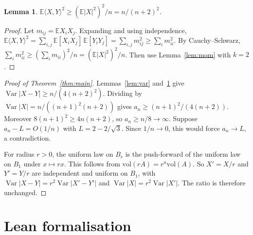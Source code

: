 \documentclass[11pt]{article}
\newtheorem{lemma}[theorem]{Lemma}
\newcommand{\E}{\mathbb{E}}
\newcommand{\Var}{\operatorname{Var}}
\begin{document}
\begin{lemma}\label{lem:inner}
$\E\langle X,Y\rangle^2 \ge (\E|X|^2)^2/n = n/(n+2)^2$.
\end{lemma}
\begin{proof}
Let $m_{ij} = \E X_iX_j$. Expanding and using independence,
$\E\langle X,Y\rangle^2 = \sum_{i,j}\E[X_iX_j]\,\E[Y_iY_j] = \sum_{i,j} m_{ij}^2 \ge \sum_i m_{ii}^2$.
By Cauchy--Schwarz, $\sum_i m_{ii}^2 \ge (\sum_i m_{ii})^2/n = (\E|X|^2)^2/n$. Then use
Lemma~\ref{lem:mom} with $k=2$.
\end{proof}

\begin{proof}[Proof of Theorem~\ref{thm:main}]
Lemmas~\ref{lem:var} and~\ref{lem:inner} give $\Var|X-Y| \ge n/(4(n+2)^2)$. Dividing by
$\Var|X| = n/((n+1)^2(n+2))$ gives $a_n \ge (n+1)^2/(4(n+2))$. Moreover
$8(n+1)^2 \ge 4n(n+2)$, so $a_n \ge n/8 \to \infty$. Suppose $a_n - L = O(1/n)$ with
$L = 2-2/\sqrt3$. Since $1/n \to 0$, this would force $a_n \to L$, a contradiction.

For radius $r > 0$, the uniform law on $B_r$ is the push-forward of the uniform law on $B_1$ under
$x \mapsto rx$. This follows from $\mathrm{vol}(rA) = r^n\mathrm{vol}(A)$. So $X' = X/r$ and $Y' = Y/r$
are independent and uniform on $B_1$, with $\Var|X-Y| = r^2\Var|X'-Y'|$ and $\Var|X| = r^2\Var|X'|$.
The ratio is therefore unchanged.
\end{proof}

\section{Lean formalisation}
\end{document}
